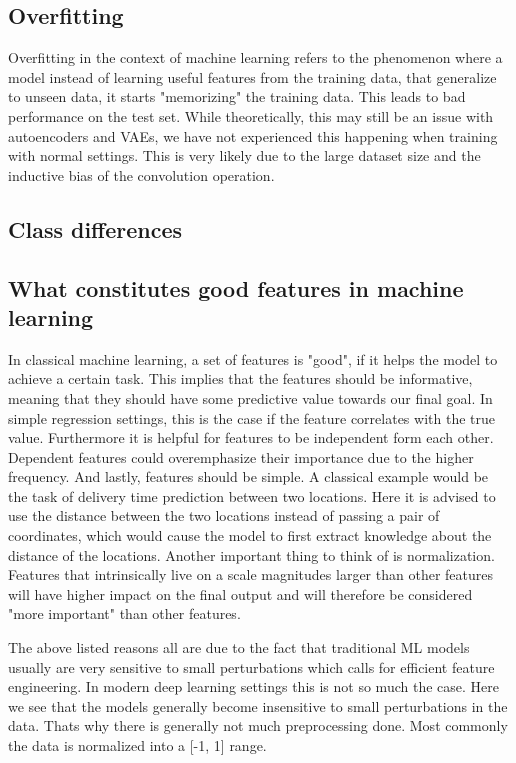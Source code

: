 \documentclass[10pt,a4paper,twoside]{article}
\begin{document}
\subsection{Overfitting}

Overfitting in the context of machine learning refers to the phenomenon where
a model instead of learning useful features from the training data, that
generalize to unseen data, it starts "memorizing" the training data. This
leads to bad performance on the test set. While theoretically, this may still
be an issue with autoencoders and VAEs, we have not experienced this happening
when training with normal settings. This is very likely due to the large
dataset size and the inductive bias of the convolution operation.

\subsection{Class differences}

\subsection{What constitutes good features in machine learning}

In classical machine learning, a set of features is "good", if it helps the
model to achieve a certain task. This implies that the features should be
informative, meaning that they should have some predictive value towards our
final goal. In simple regression settings, this is the case if the feature
correlates with the true value. Furthermore it is helpful for features to be
independent form each other. Dependent features could overemphasize their
importance due to the higher frequency. And lastly, features should be simple.
A classical example would be the task of delivery time prediction between two
locations. Here it is advised to use the distance between the two locations
instead of passing a pair of coordinates, which would cause the model to first
extract knowledge about the distance of the locations. Another important thing
to think of is normalization. Features that intrinsically live on a scale
magnitudes larger than other features will have higher impact on the final
output and will therefore be considered "more important" than other features.

The above listed reasons all are due to the fact that traditional ML models
usually are very sensitive to small perturbations which calls for efficient
feature engineering. In modern deep learning settings this is not so much the
case. Here we see that the models generally become insensitive to small
perturbations in the data. Thats why there is generally not much preprocessing
done. Most commonly the data is normalized into a [-1, 1] range.


\end{document}

